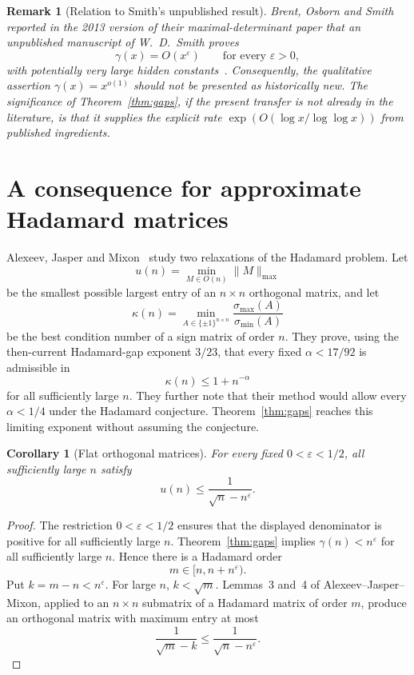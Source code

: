 \documentclass[11pt]{article}
\newtheorem{corollary}[theorem]{Corollary}
\newtheorem{remark}[theorem]{Remark}
\newcommand{\eps}{\varepsilon}
\begin{document}
\begin{remark}[Relation to Smith's unpublished result]
Brent, Osborn and Smith reported in the 2013 version of their maximal-determinant paper that an unpublished manuscript of W.~D.~Smith proves
\[
\gamma(x)=O(x^{\eps})\qquad\text{for every }\eps>0,
\]
with potentially very large hidden constants~\cite{Brent2013}.  Consequently, the qualitative assertion $\gamma(x)=x^{o(1)}$ should not be presented as historically new.  The significance of Theorem~\ref{thm:gaps}, if the present transfer is not already in the literature, is that it supplies the explicit rate
$\exp(O(\log x/\log\log x))$ from published ingredients.
\end{remark}

\section{A consequence for approximate Hadamard matrices}\label{sec:approx}
Alexeev, Jasper and Mixon~\cite{Alexeev2025} study two relaxations of the Hadamard problem.  Let
\[
u(n)=\min_{M\in O(n)}\|M\|_{\max}
\]
be the smallest possible largest entry of an $n\times n$ orthogonal matrix, and let
\[
\kappa(n)=\min_{A\in\{\pm1\}^{n\times n}}
\frac{\sigma_{\max}(A)}{\sigma_{\min}(A)}
\]
be the best condition number of a sign matrix of order $n$.
They prove, using the then-current Hadamard-gap exponent $3/23$, that every fixed
$\alpha<17/92$ is admissible in
\[
\kappa(n)\le1+n^{-\alpha}
\]
for all sufficiently large $n$.  They further note that their method would allow every $\alpha<1/4$ under the Hadamard conjecture.  Theorem~\ref{thm:gaps} reaches this limiting exponent without assuming the conjecture.

\begin{corollary}[Flat orthogonal matrices]\label{cor:flat}
For every fixed $0<\eps<1/2$, all sufficiently large $n$ satisfy
\[
u(n)\le \frac{1}{\sqrt n-n^{\eps}}.
\]
\end{corollary}

\begin{proof}
The restriction $0<\eps<1/2$ ensures that the displayed denominator is positive for all sufficiently large $n$.  Theorem~\ref{thm:gaps} implies $\gamma(n)<n^{\eps}$ for all sufficiently large $n$.  Hence there is a Hadamard order
\[
m\in[n,n+n^{\eps}).
\]
Put $k=m-n<n^{\eps}$.  For large $n$, $k<\sqrt m$.  Lemmas~3 and~4 of Alexeev--Jasper--Mixon, applied to an $n\times n$ submatrix of a Hadamard matrix of order $m$, produce an orthogonal matrix with maximum entry at most
\[
\frac{1}{\sqrt m-k}
\le \frac{1}{\sqrt n-n^{\eps}}.
\]
\end{proof}
\end{document}
